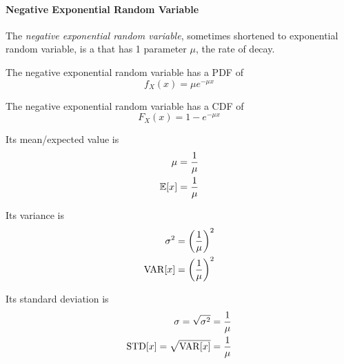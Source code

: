 \paragraph{Negative Exponential Random Variable}\label{par:Negative_Exponential_Random_Variable}
\begin{definition}\label{def:Negative_Exponential_Random_Variable}
  The \emph{negative exponential random variable}, sometimes shortened to exponential random variable, is a  that has 1 parameter $\mu$, the rate of decay.

  The negative exponential random variable has a PDF of
  \begin{equation}\label{eq:Negative_Exponential_Random_Variable-PDF}
    f_{X}(x) = \mu e^{-\mu x}
  \end{equation}

  The negative exponential random variable has a CDF of
  \begin{equation}\label{eq:Negative_Exponential_Random_Variable-CDF}
    F_{X}(x) = 1 - e^{-\mu x}
  \end{equation}

  Its mean/expected value is
  \begin{equation}\label{eq:Negative_Exponential_Random_Variable-Expected_Value}
    \begin{aligned}
      \mu &= \frac{1}{\mu} \\
      \operatorname{\operatorname{\mathbb{E}}}[x] &= \frac{1}{\mu} \\
    \end{aligned}
  \end{equation}

  Its variance is
  \begin{equation}\label{eq:Negative_Exponential_Random_Variable-Variance}
    \begin{aligned}
      \sigma^{2} &= {\left( \frac{1}{\mu} \right)}^{2} \\
      \operatorname{\operatorname{VAR}}[x] &= {\left( \frac{1}{\mu} \right)}^{2} \\
    \end{aligned}
  \end{equation}

  Its standard deviation is
  \begin{equation}\label{eq:Negative_Exponential_Random_Variable-Standard_Deviation}
    \begin{aligned}
      \sigma = \sqrt{\sigma^{2}} &= \frac{1}{\mu} \\
      \operatorname{\operatorname{STD}}[x] = \sqrt{\operatorname{\operatorname{VAR}}[x]} &= \frac{1}{\mu} \\
    \end{aligned}
  \end{equation}
\end{definition}

